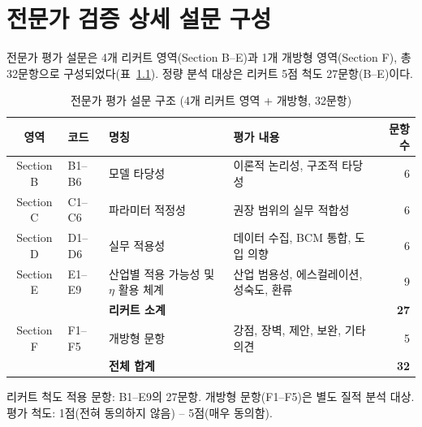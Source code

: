 

\chapter{전문가 검증 상세 설문 구성}
\label{app:survey-structure}


\label{app:survey-overview}

{전문가 평가 설문은 4개 리커트 영역(Section B--E)과 1개 개방형 영역(Section F),
총 32문항으로 구성되었다(\p{[}표~\ref{tab:app-survey-structure}\p{]}).
정량 분석 대상은 리커트 5점 척도 27문항(B--E)이다.}

\begin{table}[htbp]
\centering
\caption{전문가 평가 설문 구조 (4개 리커트 영역 + 개방형, 32문항)}
\label{tab:app-survey-structure}
\small
\begin{tabular}{c l >{\raggedright\arraybackslash}p{3.8cm} >{\raggedright\arraybackslash}p{4.5cm} r}
\toprule
\textbf{영역} & \textbf{코드} & \textbf{명칭} & \textbf{평가 내용} & \textbf{문항 수} \\
\midrule
Section B & B1--B6  & 모델 타당성      & 이론적 논리성, 구조적 타당성              & 6 \\
Section C & C1--C6  & 파라미터 적정성   & 권장 범위의 실무 적합성                    & 6 \\
{Section D} & {D1--D6}  & {실무 적용성}      & {데이터 수집, BCM 통합, 도입 의향}           & {6} \\
{Section E} & {E1--E9}  & {산업별 적용 가능성 및 $\eta$ 활용 체계} & {산업 범용성, 에스컬레이션, 성숙도, 환류} & {9} \\
\midrule
          &         & {\textbf{리커트 소계}} &                                       & {\textbf{27}} \\
\midrule
{Section F} & {F1--F5}  & {개방형 문항}      & {강점, 장벽, 제안, 보완, 기타 의견}          & {5} \\
\midrule
          &         & {\textbf{전체 합계}}  &                                        & {\textbf{32}} \\
\bottomrule
\end{tabular}
\vspace{0.5em}

\footnotesize
{\noindent 리커트 척도 적용 문항: B1--E9의 27문항. 개방형 문항(F1--F5)은 별도 질적 분석 대상.} \\
\noindent 평가 척도: 1점(전혀 동의하지 않음) -- 5점(매우 동의함).
\normalsize
\end{table}

